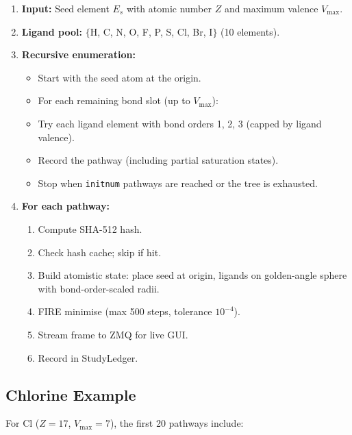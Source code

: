 \documentclass[11pt,a4paper]{article}
\begin{document}
\begin{enumerate}
  \item \textbf{Input:} Seed element $E_s$ with atomic number $Z$ and
        maximum valence $V_\text{max}$.
  \item \textbf{Ligand pool:} $\{$H, C, N, O, F, P, S, Cl, Br, I$\}$
        (10 elements).
  \item \textbf{Recursive enumeration:}
        \begin{itemize}
          \item Start with the seed atom at the origin.
          \item For each remaining bond slot (up to $V_\text{max}$):
          \item Try each ligand element with bond orders 1, 2, 3
                (capped by ligand valence).
          \item Record the pathway (including partial saturation states).
          \item Stop when \texttt{initnum} pathways are reached or the
                tree is exhausted.
        \end{itemize}
  \item \textbf{For each pathway:}
        \begin{enumerate}[label=(\alph*)]
          \item Compute SHA-512 hash.
          \item Check hash cache; skip if hit.
          \item Build atomistic state: place seed at origin, ligands on
                golden-angle sphere with bond-order-scaled radii.
          \item FIRE minimise (max 500 steps, tolerance $10^{-4}$).
          \item Stream frame to ZMQ for live GUI.
          \item Record in StudyLedger.
        \end{enumerate}
\end{enumerate}

\subsection{Chlorine Example}

For Cl ($Z = 17$, $V_\text{max} = 7$), the first 20 pathways include:
\end{document}
